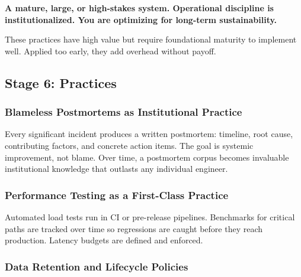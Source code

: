 \label{writing-good-code:stage-6--advanced-engineering-excellence}

\begin{notebox}

\textbf{A mature, large, or high-stakes system. Operational discipline is institutionalized. You are optimizing for long-term sustainability.}

\end{notebox}

\noindent{}These practices have high value but require foundational maturity to implement well. Applied too early, they add overhead without payoff.

\subsection*{Stage 6: Practices}\label{writing-good-code:stage-6-practices}

\subsubsection*{Blameless Postmortems as Institutional Practice}\label{writing-good-code:blameless-postmortems-as-institutional-practice}

Every significant incident produces a written postmortem: timeline, root cause, contributing factors, and concrete action items. The goal is systemic improvement, not blame. Over time, a postmortem corpus becomes invaluable institutional knowledge that outlasts any individual engineer.

\subsubsection*{Performance Testing as a First-Class Practice}\label{writing-good-code:performance-testing-as-a-first-class-practice}

Automated load tests run in CI or pre-release pipelines. Benchmarks for critical paths are tracked over time so regressions are caught before they reach production. Latency budgets are defined and enforced.

\subsubsection*{Data Retention and Lifecycle Policies}\label{writing-good-code:data-retention-and-lifecycle-policies}

